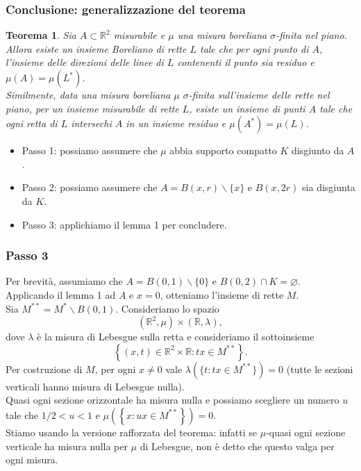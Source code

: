 \documentclass[11pt]{beamer} %
\newcommand{\<}{\langle}
\renewcommand{\>}{\rangle}
\theoremstyle{theorem}
\newtheorem{teo}{Teorema}
\theoremstyle{theorem}
\theoremstyle{theorem}
\theoremstyle{theorem}
\theoremstyle{theorem}
\begin{document}
\begin{frame}[fragile]
\frametitle{Conclusione: generalizzazione del teorema}

\begin{teo}
	Sia $A \subset \mathbb{R}^{2}$ misurabile e $\mu$ una misura boreliana $\sigma$-finita nel piano. Allora esiste un insieme Boreliano di rette $L$ tale che per ogni punto di $A$, l'insieme delle direzioni delle linee di $L$ contenenti il punto sia residuo e $\mu(A)=\mu(L^*)$. \\ \pause
	Similmente, data una misura boreliana $\mu$ $\sigma$-finita sull'insieme delle rette nel piano, per un insieme misurabile di rette $L$, esiste un insieme di punti $A$ tale che ogni retta di $L$ intersechi $A$ in un insieme residuo e $\mu(A^*)=\mu(L)$.
\end{teo}
	\pause

	\begin{itemize}
		\item Passo 1: possiamo assumere che $\mu$ abbia supporto compatto $K$ disgiunto da $A$.\\
		\item Passo 2: possiamo assumere che $A=B(x, r) \backslash\{x\}$ e $B(x, 2 r)$ sia disgiunta da $K$.\\
		\item Passo 3: applichiamo il lemma 1 per concludere.
	\end{itemize}
\end{frame}


\begin{frame}
\frametitle{Passo 3}
Per brevità, assumiamo che $A=B(0,1) \backslash\{0\}$ e $B(0,2) \cap K=\varnothing$.\\ \pause
Applicando il lemma 1 ad $A$ e $x=0$, otteniamo l'insieme di rette $M$.\\ \pause Sia $M^{* *}=M^{*} \backslash B(0,1)$. Consideriamo lo spazio
$$
\left(\mathbb{R}^{2}, \mu\right) \times(\mathbb{R}, \lambda),
$$
dove $\lambda$ è la misura di Lebesgue sulla retta e consideriamo il sottoinsieme
$$
\left\{(x, t) \in \mathbb{R}^{2} \times \mathbb{R}: t x \in M^{* *}\right\} .
$$ \pause
Per costruzione di $M$, per ogni $x \neq 0$ vale $\lambda(\{t: tx \in M^{**}\})=0$ (tutte le sezioni verticali hanno misura di Lebesgue nulla).\\ \pause
Quasi ogni sezione orizzontale ha misura nulla e possiamo scegliere un numero $u$ tale che $1 / 2<u<1$ e $\mu\left(\left\{x: u x \in M^{* *}\right\}\right)=0$.\\ \pause
Stiamo usando la versione rafforzata del teorema: infatti se $\mu$-quasi ogni sezione verticale ha misura nulla per $\mu$ di Lebesgue, non è detto che questo valga per ogni misura.\\

\end{frame}
\end{document}
